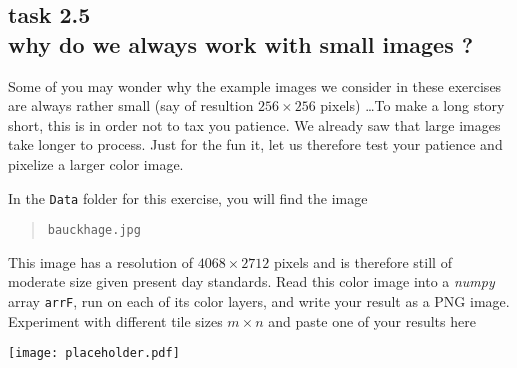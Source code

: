 
\subsection*{task 2.5 \\[1ex] why do we always work with small images ?}

Some of you may wonder why the example images we consider in these exercises are always rather small (say of resultion $256 \times 256$ pixels) \ldots To make a long story short, this is in order not to tax you patience. We already saw that large images take longer to process. Just for the fun it, let us therefore test your patience and pixelize a larger color image.  

In the \texttt{Data} folder for this exercise, you will find the image
\begin{quote}
    \texttt{bauckhage.jpg}
\end{quote}
This image has a resolution of $4068 \times 2712$ pixels and is therefore still of moderate size given present day standards. Read this color image into a \emph{numpy} array \texttt{arrF}, run  on each of its color layers, and write your result as a PNG image. Experiment with different tile sizes $m \times n$ and paste one of your results here \\[1cm]
\begin{center}
\texttt{[image: placeholder.pdf]} 
\end{center}





